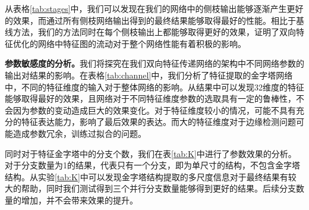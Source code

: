 \documentclass[master]{thesis-uestc}
\begin{document}
{从表格\ref{tab:stages}中，我们可以发现在我们的网络中的侧枝输出能够逐渐产生更好的效果，而通过所有侧枝网络输出得到的最终结果能够取得最好的性能。相比于基线方法，我们的方法同时在每个侧枝输出上都能够取得更好的效果，证明了双向特征优化的网络中特征图的流动对于整个网络性能有着积极的影响。
 

\textbf{参数敏感度的分析。}我们将探究在我们双向特征传递网络的架构中不同网络参数的输出对结果的影响。在表格\ref{tab:channel}中，我们分析了特征提取的金字塔网络中，不同的特征维度的输入对于整体网络的影响。从结果中可以发现32维度的特征能够取得最好的效果，且网络对于不同特征维度参数的选取具有一定的鲁棒性，不会因为参数的变动造成巨大的效果变化。对于特征维度较小的情况，可能不具有充分的特征表达能力，影响了最后效果的表达。而大的特征维度对于边缘检测问题可能造成参数冗余，训练过拟合的问题。
\begin{table}
    \centering
    \caption{网络特征提取的金字塔架构中特征的维度对于最后效果的影响}
\label{tab:channel}
\end{table}

同时对于特征金字塔中的分支个数，我们在表\ref{tab:K}中进行了参数效果的分析。对于分支数量为1的结果，代表只有一个分支，即为单尺寸的结构，不包含金字塔结构。从实验\ref{tab:K}中可以发现金字塔结构提取的多尺度信息对于最终结果有较大的帮助，同时我们测试得到三个并行分支数量能够得到更好的结果。后续分支数量的增加，并不会带来效果的提升。
\begin{table}
    \centering
    \caption{网络特征提取的金字塔架构中金字塔分支数对于最后效果的影响}
\label{tab:K}
\end{table}


}
\end{document}
